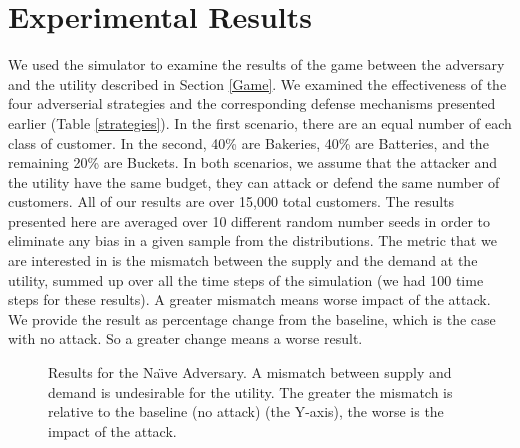 \section{Experimental Results}
\label{Experimental Results}

We used the simulator to examine the results of the game between the adversary and the utility described in Section \ref{Game}. We examined the effectiveness of the four adverserial strategies and the corresponding defense mechanisms presented earlier (Table \ref{strategies}). In the first scenario, there are an equal number of each class of customer. In the second, 40\% are Bakeries, 40\% are Batteries, and the remaining 20\% are Buckets. In both scenarios, we assume that the attacker and the utility have the same budget, \ie they can attack or defend the same number of customers. All of our results are over 15,000 total customers. The results presented here are averaged over 10 different random number seeds in order to eliminate any bias in a given sample from the distributions. 
The metric that we are interested in is the mismatch between the supply and the demand at the utility, summed up over all the time steps of the simulation (we had 100 time steps for these results). A greater mismatch means worse impact of the attack. We provide the result as percentage change from the baseline, which is the case with no attack. So a greater change means a worse result. 

\begin{figure}[htp]
    \centering
    \hfill
    \caption{Results for the Na\"\i ve Adversary. A mismatch between supply and demand is undesirable for the utility. The greater the mismatch is relative to the baseline (no attack) (the Y-axis), the worse is the impact of the attack.}
    \label{naive}  
\end{figure}

